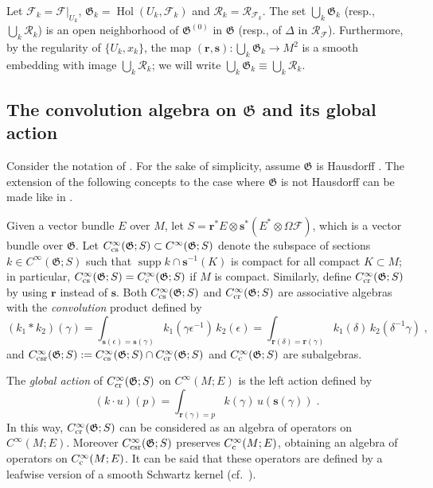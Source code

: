 \documentclass{memo-l}
\theoremstyle{plain}
\theoremstyle{definition}
\theoremstyle{remark}
\newcommand{\FF}{\mathcal{F}}
\newcommand{\RR}{\mathcal{R}}
\newcommand{\fG}{\mathfrak{G}}
\newcommand{\bfr}{\boldsymbol{r}}
\newcommand{\bfs}{\boldsymbol{s}}
\newcommand{\supp}{\operatorname{supp}}
\newcommand{\Hol}{\operatorname{Hol}}
\newcommand{\Cinftyc}{C^\infty_{\text{\rm c}}}
\numberwithin{section}{chapter}
\numberwithin{equation}{section}%
\begin{document}
Let $\FF_k=\FF|_{U_k}$, $\fG_k=\Hol(U_k,\FF_k)$ and $\RR_k=\RR_{\FF_k}$. The set $\bigcup_k\fG_k$ (resp., $\bigcup_k\RR_k$) is an open neighborhood of $\fG^{(0)}$ in $\fG$ (resp., of $\Delta$ in $\RR_\FF$). Furthermore, by the regularity of $\{U_k,x_k\}$, the map $(\bfr,\bfs):\bigcup_k\fG_k\to M^2$ is a smooth embedding with image $\bigcup_k\RR_k$; we will write $\bigcup_k\fG_k\equiv\bigcup_k\RR_k$.



\subsection{The convolution algebra on $\fG$ and its global action}\label{ss: global action}

Consider the notation of . For the sake of simplicity, assume $\fG$ is Hausdorff \cite{Connes1979}. The extension of the following concepts to the case where $\fG$ is not Hausdorff can be made like in \cite{Connes1982}.

Given a vector bundle $E$ over $M$, let $S=\bfr^*E\otimes \bfs^*(E^*\otimes\Omega\FF)$, which is a vector bundle over $\fG$. Let $C^\infty_{\text{\rm cs}}(\fG;S)\subset C^\infty(\fG;S)$ denote the subspace of sections $k\in C^\infty(\fG;S)$ such that $\supp k\cap\bfs^{-1}(K)$ is compact for all compact $K\subset M$; in particular, $C^\infty_{\text{\rm cs}}(\fG;S)=\Cinftyc(\fG;S)$ if $M$ is compact. Similarly, define $C^\infty_{\text{\rm cr}}(\fG;S)$ by using $\bfr$ instead of $\bfs$. Both $C^\infty_{\text{\rm cs}}(\fG;S)$ and $C^\infty_{\text{\rm cr}}(\fG;S)$ are associative algebras with the \emph{convolution} product defined by
\[
(k_1*k_2)(\gamma)=\int_{\bfs(\epsilon)=\bfs(\gamma)}k_1(\gamma\epsilon^{-1})\,k_2(\epsilon)
=\int_{\bfr(\delta)=\bfr(\gamma)}k_1(\delta)\,k_2(\delta^{-1}\gamma)\;,
\]
and $C^\infty_{\text{\rm csr}}(\fG;S):=C^\infty_{\text{\rm cs}}(\fG;S)\cap C^\infty_{\text{\rm cr}}(\fG;S)$ and $\Cinftyc(\fG;S)$ are subalgebras. 

The \emph{global action} of $C^\infty_{\text{\rm cr}}(\fG;S)$ on $C^\infty(M;E)$ is the left action defined by
\[
(k\cdot u)(p)=\int_{\bfr(\gamma)=p}k(\gamma)\,u(\bfs(\gamma))\;.
\]
In this way, $C^\infty_{\text{\rm cr}}(\fG;S)$ can be considered as an algebra of operators on $C^\infty(M;E)$. Moreover $C^\infty_{\text{\rm csr}}(\fG;S)$ preserves $\Cinftyc(M;E)$, obtaining an algebra of operators on $\Cinftyc(M;E)$. It can be said that these operators are defined by a leafwise version of a smooth Schwartz kernel (cf.\ ).
\end{document}
